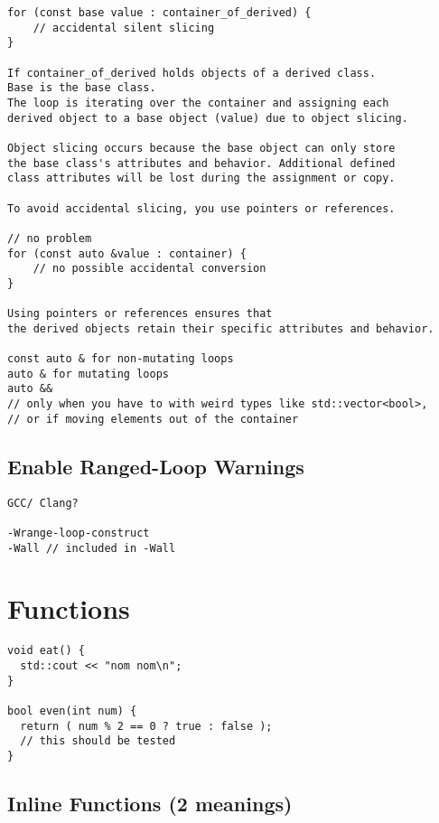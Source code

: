 \documentclass[openany]{report}
\begin{document}
\begin{verbatim}
for (const base value : container_of_derived) {
    // accidental silent slicing
}

If container_of_derived holds objects of a derived class. 
Base is the base class.
The loop is iterating over the container and assigning each
derived object to a base object (value) due to object slicing.

Object slicing occurs because the base object can only store
the base class's attributes and behavior. Additional defined 
class attributes will be lost during the assignment or copy.

To avoid accidental slicing, you use pointers or references.

// no problem
for (const auto &value : container) {
    // no possible accidental conversion
}

Using pointers or references ensures that 
the derived objects retain their specific attributes and behavior.

const auto & for non-mutating loops
auto & for mutating loops
auto && 
// only when you have to with weird types like std::vector<bool>,
// or if moving elements out of the container
\end{verbatim}

\subsection{Enable Ranged-Loop Warnings}

\begin{verbatim}
GCC/ Clang?

-Wrange-loop-construct
-Wall // included in -Wall
\end{verbatim}

\section{Functions}

\begin{verbatim}
void eat() {
  std::cout << "nom nom\n";
}

bool even(int num) {
  return ( num % 2 == 0 ? true : false );
  // this should be tested
}
\end{verbatim}

\subsection{Inline Functions (2 meanings)}
\end{document}
